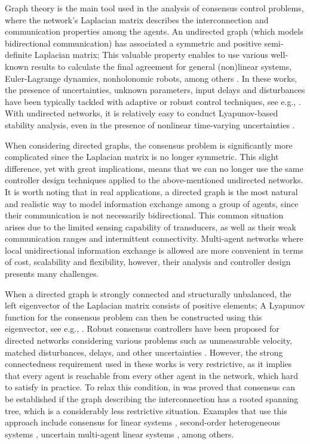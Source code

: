 \documentclass[journal,twoside]{IEEEtran}
\begin{document}
Graph theory is the main tool used in the analysis of consensus control problems, where the network's Laplacian matrix describes the interconnection and communication properties among the agents. 
An undirected graph (which models bidirectional communication) has associated a symmetric and positive semi-definite Laplacian matrix; This valuable property enables to use various well-known results to calculate the final agreement for general (non)linear systems, Euler-Lagrange dynamics, nonholonomic robots, among others \cite{Lietal11, REN09, LISTMASADA}. 
In these works, the presence of uncertainties, unknown parameters, input delays and disturbances have been typically tackled with adaptive or robust control techniques, see e.g., \cite{PHIetal, NUNOetal, SUetal, ROMNUNALD}. 
With undirected networks, it is relatively easy to conduct Lyapunov-based stability analysis, even in the presence of nonlinear time-varying uncertainties \cite{BECCROV, KATROV}.

When considering directed graphs, the consensus problem is significantly more complicated since the Laplacian matrix is no longer symmetric. 
This slight difference, yet with great implications, means that we can no longer use the same controller design techniques applied to the above-mentioned undirected networks.
It is worth noting that in real applications, a directed graph is the most natural and realistic way to model information exchange among a group of agents, since their communication is not necessarily bidirectional. 
This common situation arises due to the limited sensing capability of transducers, as well as their weak communication ranges and intermittent connectivity. 
Multi-agent networks where local unidirectional information exchange is allowed are more convenient in terms of cost, scalability and flexibility, however, their analysis and controller design presents many challenges.

When a directed graph is strongly connected and structurally unbalanced, the left eigenvector of the Laplacian matrix consists of positive elements; A Lyapunov function for the consensus problem can then be constructed using this eigenvector, see e.g., \cite{Zhanetal,  DASLEW, GHACOR, DOMHAD, CAOMORAND}. 
Robust consensus controllers have been proposed for directed networks considering various problems such as unmeasurable velocity, matched disturbances, delays, and other uncertainties \cite{SHIJOH, LIetal19, ZHANGetal}. 
However, the strong connectedness requirement used in these works is very restrictive, as it implies that every agent is reachable from every other agent in the network, which hard to satisfy in practice. 
To relax this condition, in \cite{RENBEA05} was proved that consensus can be established if the graph describing the interconnection has a rooted spanning tree, which is a considerably less restrictive situation.
Examples that use this approach include consensus for linear systems \cite{Lietal15}, second-order heterogeneous systems \cite{MEIRENCHEN},  uncertain multi-agent linear systems \cite{LIUWUZHO}, among others. 
\end{document}
